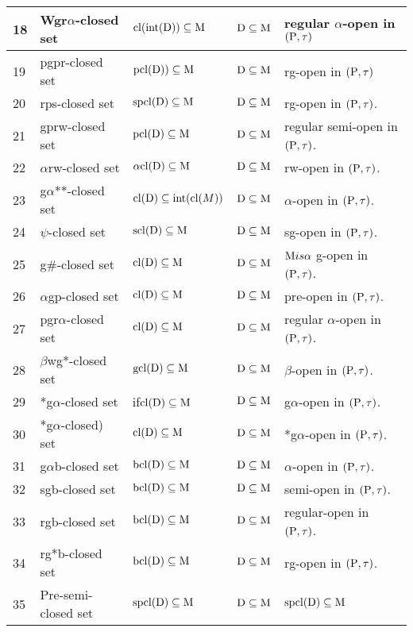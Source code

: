 {\begin{longtable}{|p{1cm}|>{\raggedright}p{5cm}|>{\centering}p{2.5cm}|>{\centering}p{1.7cm}|>{\centering}p{2.8cm}|}
\hline
18 & Wgr$\alpha$-closed set\cite{key32} & $\mathrm{cl}(\mbox{int}(\mathrm{D})) \subseteq \mathrm{M}$ & $\mathrm{D} \subseteq \mathrm{M}$ & regular $\alpha$-open in $(\mathrm{P}, \tau)$\tabularnewline
\hline
19 & pgpr-closed set\cite{key6} & $\mathrm{pcl}(\mathrm{D})) \subseteq \mathrm{M}$ & $\mathrm{D} \subseteq \mathrm{M}$ & rg-open in $(\mathrm{P}, \tau)$\tabularnewline
\hline
20 & rps-closed set\cite{key60} & $\mathrm{spcl}(\mathrm{D}) \subseteq \mathrm{M}$ & $\mathrm{D} \subseteq \mathrm{M}$ & rg-open in $(\mathrm{P}, \tau)$.\tabularnewline
\hline
21 & gprw-closed set\cite{key55} & $\mathrm{pcl}(\mathrm{D}) \subseteq \mathrm{M}$ & $\mathrm{D} \subseteq \mathrm{M}$ & regular semi-open in $(\mathrm{P}, \tau)$.\tabularnewline
\hline
22 & $\alpha$rw-closed set\cite{key76} & $\alpha\mathrm{cl}(\mathrm{D}) \subseteq \mathrm{M}$ & $\mathrm{D}\subseteq\mathrm{M}$ & rw-open in $(\mathrm{P}, \tau)$.\tabularnewline
\hline
23 & g$\alpha$**-closed set\cite{key} & $\mathrm{cl}(\mathrm{D}) \subseteq\mbox{int}(\mathrm{cl}(M))$ & $\mathrm{D} \subseteq \mathrm{M}$ & $\alpha$-open in $(\mathrm{P},\tau)$.\tabularnewline
\hline
24 & $\psi$-closed set\cite{key67} & $\mathrm{scl}(\mathrm{D}) \subseteq \mathrm{M}$ & $\mathrm{D} \subseteq \mathrm{M}$ & sg-open in $(\mathrm{P}, \tau)$.\tabularnewline
\hline
25 & g\#-closed set\cite{key66} & $\mathrm{cl}(\mathrm{D}) \subseteq \mathrm{M}$ & $\mathrm{D} \subseteq \mathrm{M}$ & $\mathrm{M} is \alpha$ g-open in $(\mathrm{P}, \tau)$.\tabularnewline
\hline
26 & $\alpha$gp-closed set\cite{key26} & $\mathrm{cl}(\mathrm{D}) \subseteq \mathrm{M}$ & $\mathrm{D} \subseteq \mathrm{M}$ & pre-open in $(\mathrm{P}, \tau)$.\tabularnewline
\hline
27 & pgr$\alpha$-closed set\cite{key14} & $\mathrm{cl}(\mathrm{D}) \subseteq \mathrm{M}$ & $\mathrm{D} \subseteq \mathrm{M}$ & regular $\alpha$-open in $(\mathrm{P}, \tau)$.\tabularnewline
\hline
28 & $\beta$wg*-closed set\cite{key18} & $\mathrm{gcl}(\mathrm{D}) \subseteq \mathrm{M}$ & $\mathrm{D} \subseteq \mathrm{M}$ & $\beta$-open in $(\mathrm{P}, \tau)$.\tabularnewline
\hline
29 & *g$\alpha$-closed set\cite{key73} & if$\mathrm{cl}(\mathrm{D}) \subseteq \mathrm{M}$ & $\mathrm{D} \subseteq \mathrm{M}$ & g$\alpha$-open in $(\mathrm{P},\tau)$.\tabularnewline
\hline
30 & *g$\alpha$-closed) set\cite{key74} & $\mathrm{cl}(\mathrm{D}) \subseteq \mathrm{M}$ & $\mathrm{D} \subseteq \mathrm{M}$ & *g$\alpha$-open in $(\mathrm{P}, \tau)$.\tabularnewline
\hline
31 & g$\alpha$b-closed set\cite{key75} & $\mathrm{bcl}(\mathrm{D}) \subseteq \mathrm{M}$ & $\mathrm{D} \subseteq \mathrm{M}$ & $\alpha$-open in $(\mathrm{P}, \tau)$.\tabularnewline
\hline
32 & sgb-closed set\cite{key28} & $\mathrm{bcl}(\mathrm{D}) \subseteq \mathrm{M}$ & $\mathrm{D} \subseteq \mathrm{M}$ & semi-open in $(\mathrm{P}, \tau)$.\tabularnewline
\hline
33 & rgb-closed set\cite{key40} & $\mathrm{bcl}(\mathrm{D}) \subseteq \mathrm{M}$ & $\mathrm{D} \subseteq \mathrm{M}$ & regular-open in $(\mathrm{P}, \tau)$.\tabularnewline
\hline
34 & rg*b-closed set\cite{key27} & $\mathrm{bcl}(\mathrm{D}) \subseteq \mathrm{M}$ & $\mathrm{D} \subseteq \mathrm{M}$ & rg-open in $(\mathrm{P}, \tau)$.\tabularnewline
\hline
35 & Pre-semi-closed set\cite{key68} & $\mathrm{spcl}(\mathrm{D}) \subseteq \mathrm{M}$ & $\mathrm{D}\subseteq\mathrm{M}$ & $\mathrm{spcl}(\mathrm{D}) \subseteq \mathrm{M}$\tabularnewline

\end{longtable}}
